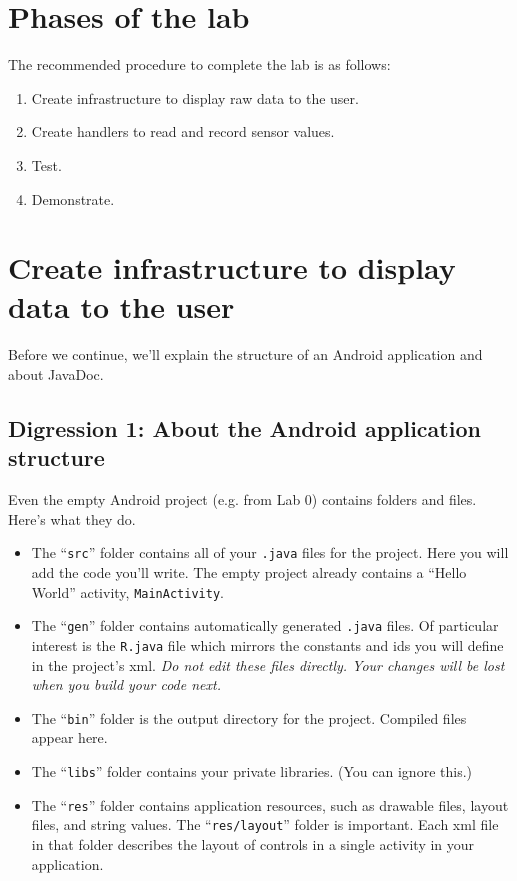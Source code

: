 \documentclass[10pt]{article}
\begin{document}
\section{Phases of the lab}

The recommended procedure to complete the lab is as follows:

\begin{enumerate}
\item Create infrastructure to display raw data to the user.
\item Create handlers to read and record sensor values.
\item Test.
\item Demonstrate.
\end{enumerate}

\section{Create infrastructure to display data to the user}

Before we continue, we'll explain the structure of an Android application and about JavaDoc.

\subsection{Digression 1: About the Android application structure}

Even the empty Android project (e.g. from Lab 0) contains folders and files. Here's what they do.

\begin{itemize}
\item The ``{\tt src}'' folder contains all of your {\tt .java} files for the project. Here you will add the code you'll write. The empty project already contains a ``Hello World'' activity, {\tt MainActivity}.
\item The ``{\tt gen}'' folder contains automatically generated {\tt .java} files. Of particular interest is the {\tt R.java} file which mirrors the constants and ids you will define in the project's xml. \emph{Do not edit these files directly. Your changes will be lost when you build your code next.}
\item The ``{\tt bin}'' folder is the output directory for the project. Compiled files appear here.
\item The ``{\tt libs}'' folder contains your private libraries. (You can ignore this.)
\item The ``{\tt res}'' folder contains application resources, such as drawable files, layout files, and string values. The ``{\tt res/layout}'' folder is important. Each xml file in that folder describes the layout of controls in a single activity in your application. %
\end{itemize}
\end{document}
